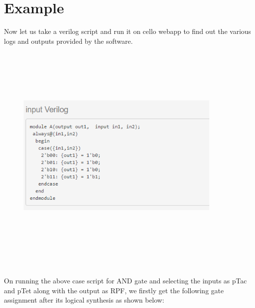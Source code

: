 \documentclass[11pt]{article}
\begin{document}
\section*{Example}
Now let us take a verilog script and run it on cello webapp to find out the various logs and outputs provided by the software.\cite{Cellocad}
\begin{figure}[ht!]
\centering
\includegraphics[width=10cm,height=11cm,keepaspectratio]{ex_input.png}
\label{Sample case input for AND gate}
\end{figure}
\\[\baselineskip]    
On running the above case script for AND gate and selecting the inputs as pTac and pTet along with the output as RPF, we firstly get the following gate assignment after its logical synthesis as shown below:  
\end{document}
